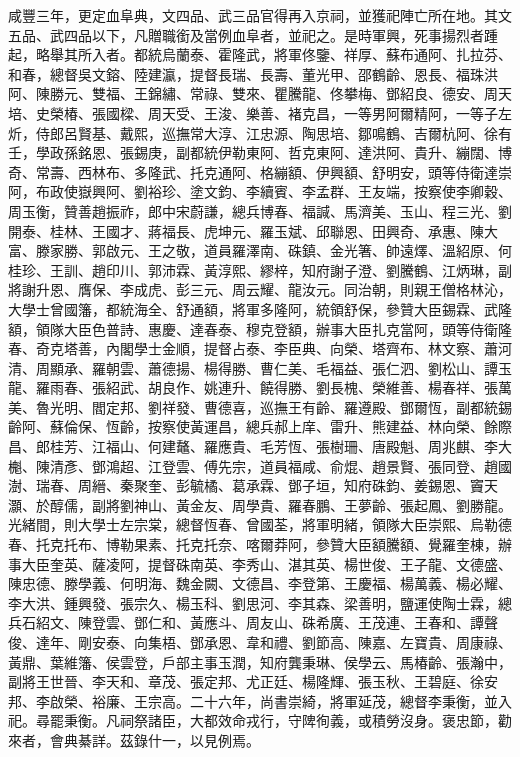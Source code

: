 \begin{pinyinscope}
咸豐三年，更定血阜典，文四品、武三品官得再入京祠，並獲祀陣亡所在地。其文五品、武四品以下，凡贈職銜及當例血阜者，並祀之。是時軍興，死事揚烈者踵起，略舉其所入者。都統烏蘭泰、霍隆武，將軍佟鑒、祥厚、蘇布通阿、扎拉芬、和春，總督吳文鎔、陸建瀛，提督長瑞、長壽、董光甲、邵鶴齡、恩長、福珠洪阿、陳勝元、雙福、王錦繡、常祿、雙來、瞿騰龍、佟攀梅、鄧紹良、德安、周天培、史榮椿、張國樑、周天受、王浚、樂善、褚克昌，一等男阿爾精阿，一等子左炘，侍郎呂賢基、戴熙，巡撫常大淳、江忠源、陶思培、鄒鳴鶴、吉爾杭阿、徐有壬，學政孫銘恩、張錫庚，副都統伊勒東阿、哲克東阿、達洪阿、貴升、繃闊、博奇、常壽、西林布、多隆武、托克通阿、格繃額、伊興額、舒明安，頭等侍衛達崇阿，布政使嶽興阿、劉裕珍、塗文鈞、李續賓、李孟群、王友端，按察使李卿穀、周玉衡，贊善趙振祚，郎中宋蔚謙，總兵博春、福諴、馬濟美、玉山、程三光、劉開泰、桂林、王國才、蔣福長、虎坤元、羅玉斌、邱聯恩、田興奇、承惠、陳大富、滕家勝、郭啟元、王之敬，道員羅澤南、硃鎮、金光箸、帥遠燡、溫紹原、何桂珍、王訓、趙印川、郭沛霖、黃淳熙、繆梓，知府謝子澄、劉騰鶴、江炳琳，副將謝升恩、膺保、李成虎、彭三元、周云耀、龍汝元。同治朝，則親王僧格林沁，大學士曾國籓，都統海全、舒通額，將軍多隆阿，統領舒保，參贊大臣錫霖、武隆額，領隊大臣色普詩、惠慶、達春泰、穆克登額，辦事大臣扎克當阿，頭等侍衛隆春、奇克塔善，內閣學士金順，提督占泰、李臣典、向榮、塔齊布、林文察、蕭河清、周顯承、羅朝雲、蕭德揚、楊得勝、曹仁美、毛福益、張仁泗、劉松山、譚玉龍、羅雨春、張紹武、胡良作、姚連升、饒得勝、劉長槐、榮維善、楊春祥、張萬美、魯光明、閻定邦、劉祥發、曹德喜，巡撫王有齡、羅遵殿、鄧爾恆，副都統錫齡阿、蘇倫保、恆齡，按察使黃運昌，總兵郝上庠、雷升、熊建益、林向榮、餘際昌、郎桂芳、江福山、何建鼇、羅應貴、毛芳恆、張樹珊、唐殿魁、周兆麒、李大櫆、陳清彥、鄧鴻超、江登雲、傅先宗，道員福咸、俞焜、趙景賢、張同登、趙國澍、瑞春、周縉、秦聚奎、彭毓橘、葛承霖、鄧子垣，知府硃鈞、姜錫恩、竇天灝、於醇儒，副將劉神山、黃金友、周學貴、羅春鵬、王夢齡、張起鳳、劉勝龍。光緒間，則大學士左宗棠，總督恆春、曾國荃，將軍明緒，領隊大臣崇熙、烏勒德春、托克托布、博勒果素、托克托奈、喀爾莽阿，參贊大臣額騰額、覺羅奎棟，辦事大臣奎英、薩凌阿，提督硃南英、李秀山、湛其英、楊世俊、王子龍、文德盛、陳忠德、滕學義、何明海、魏金闕、文德昌、李登第、王慶福、楊萬義、楊必耀、李大洪、鍾興發、張宗久、楊玉科、劉思河、李其森、梁善明，鹽運使陶士霖，總兵石紹文、陳登雲、鄧仁和、黃應斗、周友山、硃希廣、王茂連、王春和、譚聲俊、達年、剛安泰、向集梧、鄧承恩、韋和禮、劉節高、陳嘉、左寶貴、周康祿、黃鼎、葉維籓、侯雲登，戶部主事玉潤，知府龔秉琳、侯學云、馬椿齡、張瀚中，副將王世晉、李天和、章茂、張定邦、尤正廷、楊隆輝、張玉秋、王碧庭、徐安邦、李啟榮、裕廉、王宗高。二十六年，尚書崇綺，將軍延茂，總督李秉衡，並入祀。尋罷秉衡。凡祠祭諸臣，大都效命戎行，守陴徇義，或積勞沒身。褒忠節，勸來者，會典綦詳。茲錄什一，以見例焉。


\end{pinyinscope}
